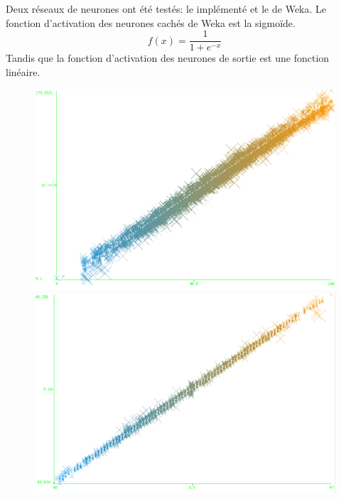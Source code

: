Deux réseaux de neurones ont été testés: le \rbf implémenté et le \mlp de Weka.
Le fonction d'activation des neurones cachés de Weka est la sigmoïde.
\[ f(x) = \frac{1}{1+e^{-x}} \]
Tandis que la fonction d'activation des neurones de sortie est une fonction linéaire.

\begin{figure}
 \begin{minipage}[c]{\mpwekawidth}
  \includegraphics[width=\textwidth]{../figures/virtualResultSpeed.png}
 \end{minipage}
 \begin{minipage}[c]{\mpwekawidth}
  \includegraphics[width=\textwidth]{../figures/virtualHeadResult.png}
 \end{minipage}
 \label{we:virtualResult}
\end{figure}
